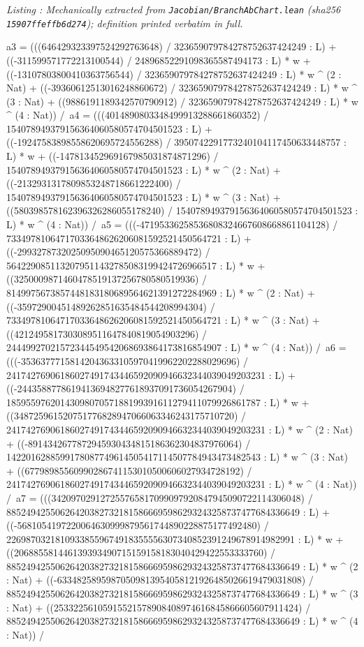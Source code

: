 \documentclass[a4paper,11pt]{article}
\newcounter{leanlisting}
\newenvironment{leanlisting}[2]{%
  \refstepcounter{leanlisting}\label{#2}%
  \begin{center}\textit{\small Listing \theleanlisting: #1}\end{center}%
  \Verbatim[breaklines=true,breakanywhere=true,fontsize=\footnotesize,frame=single,framesep=4pt,rulecolor=\color{gray!50},fillcolor=\color{gray!5}]%
}{%
  \endVerbatim%
}
\theoremstyle{plain}
\theoremstyle{definition}
\theoremstyle{remark}
\begin{document}
\begin{leanlisting}{Mechanically extracted from \texttt{Jacobian/BranchAbChart.lean} (sha256 \texttt{15907ffeffb6d274}); definition printed verbatim in full.}{lst:def-chartclass}
      a3 = (((646429323397524292763648) / 323659079784278752637424249 : L) + ((-311599571772213100544) / 24896852291098365587494173 : L) * w + ((-13107803800410363756544) / 323659079784278752637424249 : L) * w ^ (2 : Nat) + ((-39360612513016248860672) / 323659079784278752637424249 : L) * w ^ (3 : Nat) + ((9886191189342570790912) / 323659079784278752637424249 : L) * w ^ (4 : Nat)) /\
      a4 = (((4014890803348499913288661860352) / 154078949379156364060580574704501523 : L) + ((-19247583898558620695724556288) / 3950742291773240104117450633448757 : L) * w + ((-147813452969167985031874871296) / 154078949379156364060580574704501523 : L) * w ^ (2 : Nat) + ((-2132931317809853248718661222400) / 154078949379156364060580574704501523 : L) * w ^ (3 : Nat) + ((580398578162396326286055178240) / 154078949379156364060580574704501523 : L) * w ^ (4 : Nat)) /\
      a5 = (((-47195336258536808324667608668861104128) / 73349781064717033648626206081592521450564721 : L) + ((-2993278732025095090465120575366889472) / 5642290851132079511432785083199424726966517 : L) * w + ((3250009871460478519137256780580519936) / 8149975673857448183180689564621391272284969 : L) * w ^ (2 : Nat) + ((-35972900451489262851635484544208994304) / 73349781064717033648626206081592521450564721 : L) * w ^ (3 : Nat) + ((4212495817303089511647840819054903296) / 24449927021572344549542068693864173816854907 : L) * w ^ (4 : Nat)) /\
      a6 = (((-35363777158142043633105970419962202288029696) / 24174276906186027491743446592090946632344039049203231 : L) + ((-24435887786194136948277618937091736054267904) / 1859559762014309807057188199391611279411079926861787 : L) * w + ((348725961520751776828947066063346243175710720) / 24174276906186027491743446592090946632344039049203231 : L) * w ^ (2 : Nat) + ((-8914342677872945930434815186362304837976064) / 1422016288599178087749614505417114507784943473482543 : L) * w ^ (3 : Nat) + ((67798985560990286741153010500606027934728192) / 24174276906186027491743446592090946632344039049203231 : L) * w ^ (4 : Nat)) /\
      a7 = (((342097029127255765817099097920847945090722114306048) / 885249425506264203827321815866695986293243258737477684336649 : L) + ((-5681054197220064630999879561744890228875177492480) / 22698703218109338559674918355556307340852391249678914982991 : L) * w + ((206885581446139393490715159158183040429422553333760) / 885249425506264203827321815866695986293243258737477684336649 : L) * w ^ (2 : Nat) + ((-63348258959870509813954058121926485026619479031808) / 885249425506264203827321815866695986293243258737477684336649 : L) * w ^ (3 : Nat) + ((25332256105915521578908408974616845866605607911424) / 885249425506264203827321815866695986293243258737477684336649 : L) * w ^ (4 : Nat)) /\

\end{leanlisting}
\end{document}
